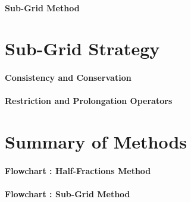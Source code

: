 \paragraph{Sub-Grid Method}
\blindtext


\section{Sub-Grid Strategy}

\paragraph{Consistency and Conservation}
\blindtext

\paragraph{Restriction and Prolongation Operators}
\blindtext


\section{Summary of Methods}

\paragraph{Flowchart : Half-Fractions Method}
\blindtext

\paragraph{Flowchart : Sub-Grid Method}
\blindtext

